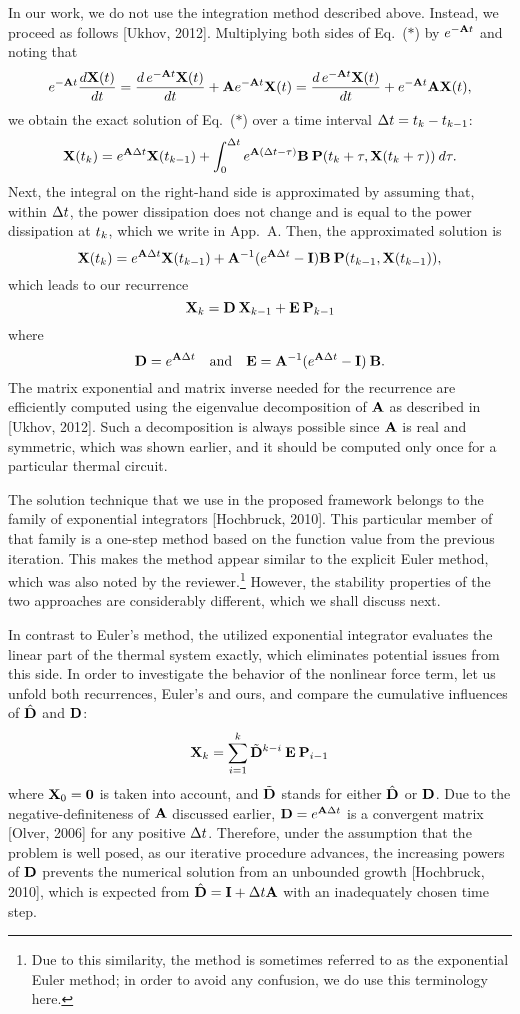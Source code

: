 \begin{authors}
In our work, we do not use the integration method described above.
Instead, we proceed as follows [Ukhov, 2012].
Multiplying both sides of Eq.~($\ast$) by $e^{- \mA \t}$ and noting that
\[
  e^{-\mA \t} \frac{d\vX(\t)}{d\t} = \frac{d\, e^{-\mA \t} \vX(\t)}{d\t} + \mA e^{-\mA \t} \vX(\t) = \frac{d\, e^{-\mA \t} \vX(\t)}{d\t} + e^{-\mA \t} \mA \vX(\t),
\]
we obtain the exact solution of Eq.~($\ast$) over a time interval $\Delta t = t_k - t_{k - 1}$:
\[
  \vX(\t_k) = e^{\mA \Delta \t} \vX(\t_{k - 1}) + \int_0^{\Delta \t} e^{\mA (\Delta t - \tau)} \mB \: \vP(\t_k + \tau, \vX(\t_k + \tau)) \: d\tau.
\]
Next, the integral on the right-hand side is approximated by assuming that, within $\Delta t$, the power dissipation does not change and is equal to the power dissipation at $t_k$, which we write in App.~A.
Then, the approximated solution is
\[
  \vX(\t_k) = e^{\mA \Delta \t} \vX(\t_{k - 1}) + \mA^{-1}(e^{\mA \Delta \t} - \mI) \mB \: \vP(\t_{k - 1}, \vX(\t_{k - 1})),
\]
which leads to our recurrence
\[
  \vX_k = \mCF \: \vX_{k - 1} + \mCS \: \vP_{k - 1}
\]
where
\[
  \mCF = e^{\mA \Delta t} \hspace{1em} \text{and} \hspace{1em} \mCS = \mA^{-1} (e^{\mA \Delta \t} - \mI) \: \mB.
\]
The matrix exponential and matrix inverse needed for the recurrence are efficiently computed using the eigenvalue decomposition of $\mA$ as described in [Ukhov, 2012].
Such a decomposition is always possible since $\mA$ is real and symmetric, which was shown earlier, and it should be computed only once for a particular thermal circuit.

The solution technique that we use in the proposed framework belongs to the family of exponential integrators [Hochbruck, 2010].
This particular member of that family is a one-step method based on the function value from the previous iteration.
This makes the method appear similar to the explicit Euler method, which was also noted by the reviewer.\footnote{Due to this similarity, the method is sometimes referred to as the exponential Euler method; in order to avoid any confusion, we do use this terminology here.}
However, the stability properties of the two approaches are considerably different, which we shall discuss next.

In contrast to Euler's method, the utilized exponential integrator evaluates the linear part of the thermal system exactly, which eliminates potential issues from this side.
In order to investigate the behavior of the nonlinear force term, let us unfold both recurrences, Euler's and ours, and compare the cumulative influences of $\hat{\mCF}$ and $\mCF$:
\[
  \vX_k = \sum_{i = 1}^k \tilde{\mCF}^{k - i} \: \mCS \: \vP_{i - 1}
\]
where $\vX_0 = \mZero$ is taken into account, and $\tilde{\mCF}$ stands for either $\hat{\mCF}$ or $\mCF$.
Due to the negative-definiteness of $\mA$ discussed earlier, $\mCF = e^{\mA \Delta \t}$ is a convergent matrix [Olver, 2006] for any positive $\Delta t$.
Therefore, under the assumption that the problem is well posed, as our iterative procedure advances, the increasing powers of $\mCF$ prevents the numerical solution from an unbounded growth [Hochbruck, 2010], which is expected from $\hat{\mCF} = \mI + \Delta \t \mA$ with an inadequately chosen time step.


\end{authors}
